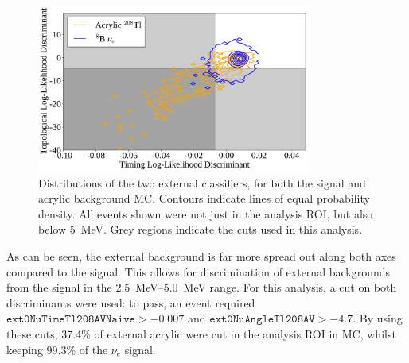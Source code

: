 \begin{figure}
    \centering
    \includegraphics[width=0.8\textwidth]{6_SolarAnalysis/images/externals_tagging_eff.pdf}
    \caption[]
    {Distributions of the two external classifiers, for both the \beight{} signal and acrylic  background MC. Contours indicate lines of equal probability density. All events shown were not just in the analysis ROI, but also below \SI{5}{\MeV}. Grey regions indicate the cuts used in this analysis.}
    \label{fig:external_classifier_corr}
\end{figure}

As can be seen, the external background is far more spread out along both axes compared to the signal. This allows for discrimination of external backgrounds from the signal in the \SIrange{2.5}{5.0}{\MeV} range. For this analysis, a cut on both discriminants were used: to pass, an event required $\mathtt{ext0NuTimeTl208AVNaive} > -0.007$ and $\mathtt{ext0NuAngleTl208AV} > -4.7$. By using these cuts, 37.4\% of external acrylic  were cut in the analysis ROI in MC, whilst keeping 99.3\% of the \beight{} $\nu_{e}$ signal.

%

